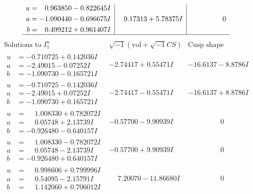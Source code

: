 \documentclass[1p]{elsarticle_modified}
\theoremstyle{definition}
\newcommand{\I}{\sqrt{-1}}
\begin{document}
$$\begin{array}{c|c|c}
\begin{aligned}
u &= \phantom{-}0.963850 - 0.822645 I \\
a &= -1.090440 - 0.696675 I \\
b &= \phantom{-}0.499212 + 0.961407 I\end{aligned}
 & \phantom{-}9.17313 + 5.78375 I & \phantom{-0.000000 } 0\\
 \hline 
 \end{array}$$\newpage$$\begin{array}{c|c|c}  
\text{Solutions to }I^u_{1}& \I (\text{vol} + \sqrt{-1}CS) & \text{Cusp shape}\\
 \hline 
\begin{aligned}
u &= -0.710725 + 0.142036 I \\
a &= -2.49015 - 0.07252 I \\
b &= -1.090730 - 0.165721 I\end{aligned}
 & -2.74417 + 0.55471 I & -16.6137 - 8.8786 I \\ \hline\begin{aligned}
u &= -0.710725 - 0.142036 I \\
a &= -2.49015 + 0.07252 I \\
b &= -1.090730 + 0.165721 I\end{aligned}
 & -2.74417 - 0.55471 I & -16.6137 + 8.8786 I \\ \hline\begin{aligned}
u &= \phantom{-}1.008330 + 0.782072 I \\
a &= \phantom{-}0.05748 + 2.13739 I \\
b &= -0.926480 - 0.640157 I\end{aligned}
 & -0.57700 - 9.90939 I & \phantom{-0.000000 } 0 \\ \hline\begin{aligned}
u &= \phantom{-}1.008330 - 0.782072 I \\
a &= \phantom{-}0.05748 - 2.13739 I \\
b &= -0.926480 + 0.640157 I\end{aligned}
 & -0.57700 + 9.90939 I & \phantom{-0.000000 } 0 \\ \hline\begin{aligned}
u &= \phantom{-}0.998606 + 0.799996 I \\
a &= \phantom{-}0.54095 - 2.15791 I \\
b &= \phantom{-}1.142060 + 0.706012 I\end{aligned}
 & \phantom{-}7.20070 - 11.86680 I & \phantom{-0.000000 } 0 \\ \hline\begin{aligned}

\end{aligned}
\end{array}$$
\end{document}
